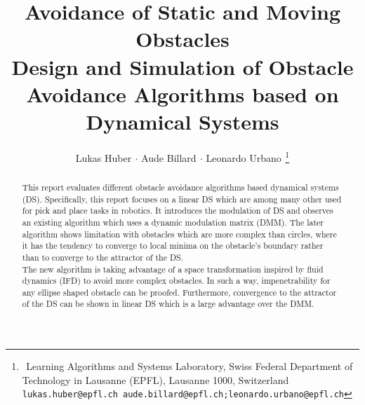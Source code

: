 \documentclass[a4paper, 10pt, conference]{docstyle/ieeeconf}      %
\title{\LARGE{ \bf{Avoidance of Static and Moving Obstacles}} \\
Design and Simulation of Obstacle Avoidance Algorithms based on Dynamical Systems
}
\author{Lukas Huber$^{}$ $\cdot$ Aude Billard$^{}$ $\cdot$ Leonardo Urbano$^{}$  %
  \thanks{$^{}$ Learning Algorithms and Systems Laboratory, Swiss Federal Department of Technology in Lausanne (EPFL), Lausanne 1000, Switzerland
 \tt \small {lukas.huber@epfl.ch}
 \tt\small{aude.billard@epfl.ch;leonardo.urbano@epfl.ch}}
}
\begin{document}
\maketitle

\begin{abstract}
  This report evaluates different obstacle avoidance algorithms based dynamical systems (DS). Specifically, this report focuses on a linear DS which are among many other used for pick and place tasks in robotics. It introduces the modulation of DS and observes an existing algorithm which uses a dynamic modulation matrix (DMM). The later algorithm shows limitation with obstacles which are more complex than circles, where it has the tendency to converge to local minima on the obstacle's boundary rather than to converge to the attractor of the DS. \\
The new algorithm is taking advantage of a space transformation inspired by fluid dynamics (IFD) to avoid more complex obstacles. In such a way, impenetrability for any ellipse shaped obstacle can be proofed. Furthermore, convergence to the attractor of the DS can be shown in linear DS which is a large advantage over the DMM.
\end{abstract}

\end{document}
